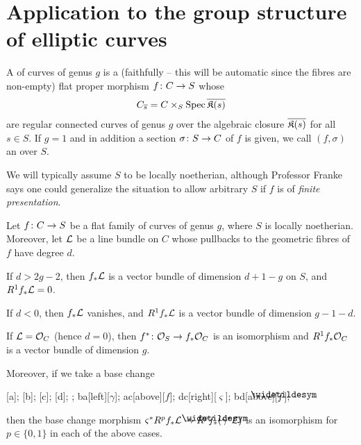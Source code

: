 \documentclass[a4paper,parskip=half,numbers=enddot, DIV=12]{scrreprt}
\begin{document}
\section{Application to the group structure of elliptic curves}
\begin{defi}
	A  of curves of genus $g$ is a (faithfully -- this will be automatic since the fibres are non-empty) flat proper morphism $f\colon C\morphism S$ whose 
	\begin{align*}
		C_{\overline{s}}=C\times_S\operatorname{Spec}\overline{\mathfrak{K}(s)}
	\end{align*}
	are regular connected curves of genus $g$ over the algebraic closure $\overline{\mathfrak{K}(s)}$ for all $s\in S$. If $g=1$ and in addition a section  $\sigma\colon S\morphism C$  of $f$ is given, we call $(f,\sigma)$ an  over $S$.
\end{defi}
We will typically assume $S$ to be locally noetherian, although Professor Franke says one could generalize the situation to allow arbitrary $S$ if $f$ is of \emph{finite presentation}.
\begin{prop}
	Let $f\colon C\morphism S$ be a flat family of curves of genus $g$, where $S$ is locally noetherian. Moreover, let $\mathcal{L}$ be a line bundle on $C$ whose pullbacks to the geometric fibres of $f$ have degree $d$.
	\begin{alphanumerate}
		\item If $d>2g-2$, then $f_*\mathcal{L}$ is a vector bundle of dimension $d+1-g$ on $S$, and $R^1f_*\mathcal{L}=0$.
		\item If $d<0$, then $f_*\mathcal{L}$ vanishes, and $R^1f_*\mathcal{L}$ is a vector bundle of dimension $g-1-d$.
		\item If $\mathcal{L}=\mathcal{O}_C$ (hence $d=0$), then $f^*\colon \Oo_S\morphism f_*\Oo_C$ is an isomorphism and $R^1f_*\mathcal{O}_C$ is a vector bundle of dimension $g$.
	\end{alphanumerate}
	Moreover, if we take a base change
	\begin{diagram*}
		[a];
		[b];
		[c];
		[d];
		;
		\scriptsize
		\arrow ba[left][$\gamma$];
		\arrow ac[above][$f$];
		\arrow dc[right][$\varsigma$];
		\arrow bd[above][$\snake{f}$];
	\end{diagram*}
	then the base change morphism $\varsigma^*R^pf_*\Ll\morphism R^p\snake{f}_*(\gamma^*\Ll)$ is an isomorphism for $p\in\{0,1\}$ in each of the above cases.
\end{prop}
\end{document}
